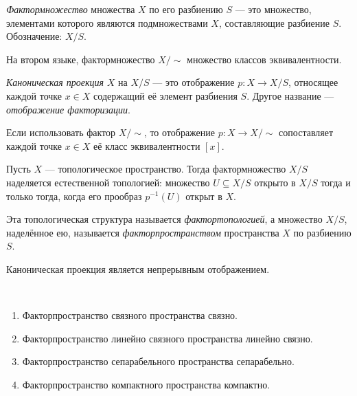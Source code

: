 \documentclass[12pt,a4paper]{article}
\begin{document}
    \begin{definition}
        \emph{Фактормножество} множества $X$ по его разбиению $S$ --- это множество, элементами которого являются подмножествами $X$, составляющие разбиение $S$. Обозначение: $X/S$.
        
        На втором языке, фактормножество $X/{\sim}$ множество классов эквивалентности.
    \end{definition}

    \begin{definition}
        \emph{Каноническая проекция} $X$ на $X/S$ --- это отображение $p: X \to X/S$, относящее каждой точке $x \in X$ содержащий её элемент разбиения $S$. Другое название --- \emph{отображение факторизации}.
    \end{definition}

    \begin{remark*}
        Если использовать фактор $X/{\sim}$, то отображение $p: X \to X/{\sim}$ сопоставляет каждой точке $x \in X$ её класс эквивалентности $[x]$.
    \end{remark*}

    \begin{definition}
        Пусть $X$ --- топологическое пространство. Тогда фактормножество $X/S$ наделяется естественной топологией: множество $U \subseteq X/S$ открыто в $X/S$ тогда и только тогда, когда его прообраз $p^{-1}(U)$ открыт в $X$.

        Эта топологическая структура называется \emph{фактортопологией}, а множество $X/S$, наделённое ею, называется \emph{факторпространством} пространства $X$ по разбиению $S$.
    \end{definition}

    \begin{remark*}
        Каноническая проекция является непрерывным отображением.
    \end{remark*}

    \begin{lemma}\ 
        \begin{enumerate}
            \item Факторпространство связного пространства связно.
            \item Факторпространство линейно связного пространства линейно связно.
            \item Факторпространство сепарабельного пространства сепарабельно.
            \item Факторпространство компактного пространства компактно.
        \end{enumerate}
    \end{lemma}
\end{document}
